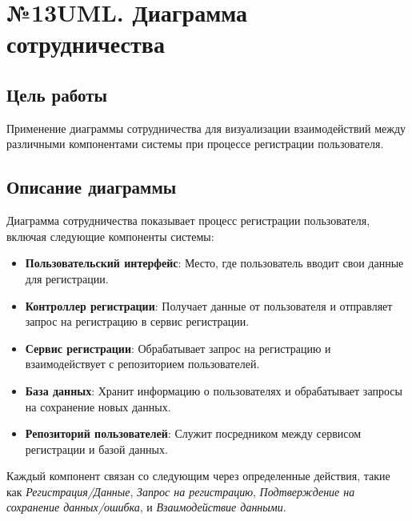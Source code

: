 \documentclass[a4paper,12pt]{article}
\begin{document}
\clearpage
\section{№13UML. Диаграмма сотрудничества}

\subsection{Цель работы}
Применение диаграммы сотрудничества для визуализации взаимодействий между различными компонентами системы при процессе регистрации пользователя.

\subsection{Описание диаграммы}
Диаграмма сотрудничества показывает процесс регистрации пользователя, включая следующие компоненты системы:

\begin{itemize}
    \item \textbf{Пользовательский интерфейс}: Место, где пользователь вводит свои данные для регистрации.
    \item \textbf{Контроллер регистрации}: Получает данные от пользователя и отправляет запрос на регистрацию в сервис регистрации.
    \item \textbf{Сервис регистрации}: Обрабатывает запрос на регистрацию и взаимодействует с репозиторием пользователей.
    \item \textbf{База данных}: Хранит информацию о пользователях и обрабатывает запросы на сохранение новых данных.
    \item \textbf{Репозиторий пользователей}: Служит посредником между сервисом регистрации и базой данных.
\end{itemize}

Каждый компонент связан со следующим через определенные действия, такие как \textit{Регистрация/Данные}, \textit{Запрос на регистрацию}, \textit{Подтверждение на сохранение данных/ошибка}, и \textit{Взаимодействие данными}.
\end{document}
